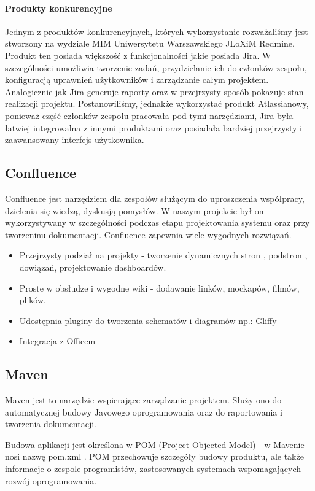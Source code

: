 \documentclass[licencjacka]{pracamgr}
\begin{document}
\paragraph{Produkty konkurencyjne}
Jednym z produktów konkurencyjnych, których wykorzystanie rozważaliśmy jest stworzony na wydziale MIM Uniwersytetu Warszawskiego JLoXiM Redmine.
Produkt ten posiada większość z funkcjonalności jakie posiada Jira. W szczególności umożliwia tworzenie zadań, przydzielanie ich do członków zespołu, 
konfiguracją uprawnień użytkowników i zarządzanie całym projektem. Analogicznie jak Jira generuje raporty oraz w przejrzysty sposób pokazuje stan 
realizacji projektu.
Postanowiliśmy, jednakże wykorzystać produkt Atlassianowy, ponieważ część członków zespołu pracowała pod tymi narzędziami, Jira była łatwiej integrowalna
 z innymi produktami oraz posiadała bardziej przejrzysty i zaawansowany interfejs użytkownika.
\subsection{Confluence}
Confluence jest narzędziem dla zespołów służącym do uproszczenia współpracy, dzielenia się wiedzą, dyskusją pomysłów.
W naszym projekcie był on wykorzystywany w szczególności podczas etapu projektowania systemu oraz przy tworzeninu dokumentacji.
Confluence zapewnia wiele wygodnych rozwiązań.
\begin{itemize}
\item Przejrzysty podział na projekty - tworzenie dynamicznych stron , podstron , dowiązań, projektowanie dashboardów.
\item Proste w obsłudze i wygodne wiki - dodawanie linków, mockapów, filmów, plików.
\item Udostępnia pluginy do tworzenia schematów i diagramów np.: Gliffy
\item Integracja z Officem  
\end{itemize}
\subsection{Maven}
Maven jest to narzędzie wspierające zarządzanie projektem. Służy ono do automatycznej budowy Javowego oprogramowania oraz do raportowania i tworzenia dokumentacji.

Budowa aplikacji jest określona w POM (Project Objected Model) - w Mavenie nosi nazwę pom.xml . 
POM przechowuje szczegóły budowy produktu, ale także  informacje o zespole programistów, zastosowanych systemach wspomagających rozwój oprogramowania.\\
\end{document}
